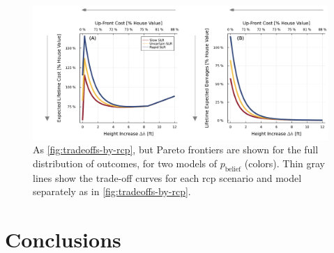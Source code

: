 \documentclass[12pt]{article}
\begin{document}
\begin{figure}
    \centering
    \includegraphics[width=\textwidth]{tradeoffs-by-prior}
    \caption{
        As \cref{fig:tradeoffs-by-rcp}, but Pareto frontiers are shown for the full distribution of outcomes, for two models of $p_\text{belief}$ (colors).
        Thin gray lines show the trade-off curves for each \gls{rcp} scenario and model separately as in \cref{fig:tradeoffs-by-rcp}.
    }\label{fig:tradeoffs-by-prior}
\end{figure}

\section{Conclusions}\label{sec:conclusions}
\end{document}
